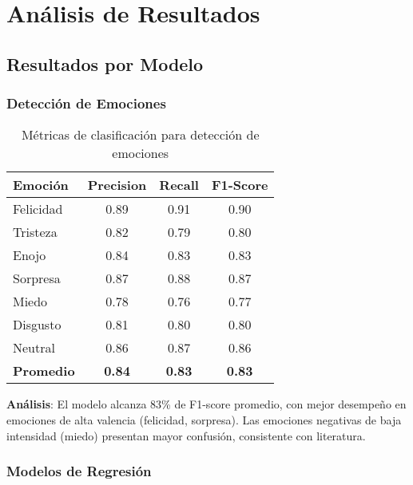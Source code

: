 
\chapter{Análisis de Resultados}
\label{chap:results}
\pagestyle{fancy}

\section{Resultados por Modelo}

\subsection{Detección de Emociones}

\begin{table}[h]
\centering
\begin{tabular}{|l|c|c|c|}
\hline
\textbf{Emoción} & \textbf{Precision} & \textbf{Recall} & \textbf{F1-Score} \\
\hline
Felicidad & 0.89 & 0.91 & 0.90 \\
Tristeza & 0.82 & 0.79 & 0.80 \\
Enojo & 0.84 & 0.83 & 0.83 \\
Sorpresa & 0.87 & 0.88 & 0.87 \\
Miedo & 0.78 & 0.76 & 0.77 \\
Disgusto & 0.81 & 0.80 & 0.80 \\
Neutral & 0.86 & 0.87 & 0.86 \\
\hline
\textbf{Promedio} & \textbf{0.84} & \textbf{0.83} & \textbf{0.83} \\
\hline
\end{tabular}
\caption{Métricas de clasificación para detección de emociones}
\label{tab:emotion_metrics}
\end{table}

\textbf{Análisis}: El modelo alcanza 83\% de F1-score promedio, con mejor desempeño en emociones de alta valencia (felicidad, sorpresa). Las emociones negativas de baja intensidad (miedo) presentan mayor confusión, consistente con literatura.

\subsection{Modelos de Regresión}

